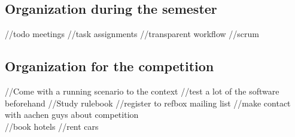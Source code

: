 \subsection{Organization during the semester}
 //todo meetings 
 //task assignments
 //transparent workflow
 //scrum 
 
 \subsection{Organization for the competition}
 //Come with a running scenario to the context
 //test a lot of the software beforehand
 //Study rulebook
 //register to refbox mailing list
 //make contact with aachen guys about competition \\
 
 //book hotels 
 //rent cars 

